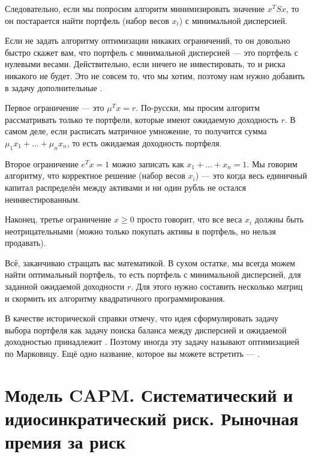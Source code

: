 Следовательно, если мы попросим алгоритм минимизировать значение $x^TSx$, то он 
постарается найти портфель (набор весов $x_i$) с минимальной дисперсией.

Если не задать алгоритму оптимизации никаких ограничений, то он довольно быстро 
скажет вам, что портфель с минимальной дисперсией --- это портфель с нулевыми 
весами. Действительно, если ничего не инвестировать, то и риска никакого не 
будет. Это не совсем то, что мы хотим, поэтому нам нужно добавить в 
задачу дополнительные .

Первое ограничение --- это $\mu^Tx = r$. По-русски, мы просим алгоритм 
рассматривать только те портфели, которые имеют ожидаемую доходность $r$. В 
самом деле, если расписать матричное умножение, то получится сумма $\mu_1x_1 + 
... + \mu_nx_n$, то есть ожидаемая доходность портфеля.

Второе ограничение $e^Tx = 1$ можно записать как $x_1 + ... + x_n = 1$. Мы 
говорим алгоритму, что корректное решение (набор весов $x_i$) --- это когда весь 
единичный капитал распределён между активами и ни один рубль не остался 
неинвестированным.

Наконец, третье ограничение $x \ge 0$ просто говорит, что все веса $x_i$ должны 
быть неотрицательными (можно только покупать активы в портфель, но нельзя 
продавать).

Всё, заканчиваю стращать вас математикой. В сухом остатке, мы всегда можем найти 
оптимальный портфель, то есть портфель с минимальной дисперсией, для заданной 
ожидаемой доходности $r$. Для этого нужно составить несколько матриц и скормить 
их алгоритму квадратичного программирования.

В качестве исторической справки отмечу, что идея сформулировать задачу выбора 
портфеля как задачу поиска баланса между дисперсией и ожидаемой доходностью 
принадлежит  \cite{markowitz1952}. 
Поэтому иногда эту задачу называют оптимизацией по Марковицу. Ещё одно название, 
которое вы можете встретить --- .

\clearpage
\section{Модель CAPM. Систематический и идиосинкратический риск. Рыночная премия
за риск}

